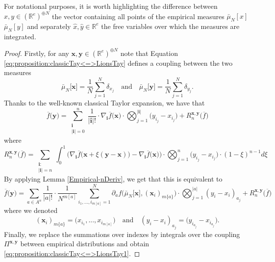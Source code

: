 \documentclass[a4paper,11pt,twoside]{article}
\numberwithin{equation}{section}
\theoremstyle{plain}
\newcommand{\bR}{\mathbb{R}}
\newcommand{\1}{\mathbbm{1}}
\begin{document}
	For notational purposes, it is worth highlighting the difference between $x, y \in (\bR^e)^{\oplus N}$ the vector containing all points of the empirical measures $\bar{\mu}_N[x]$ $\bar{\mu}_N[y]$ and separately $\hat{x}, \hat{y} \in \bR^e$ the free variables over which the measures are integrated. 
	
	
	\begin{proof}
		Firstly, for any $\boldsymbol{x}, \boldsymbol{y}\in (\bR^e)^{\oplus N}$ note that Equation \eqref{eq:proposition:classicTay<=>LionsTay} defines a coupling between the two measures
		$$
		\bar{\mu}_N\big[ \boldsymbol{x} \big] = \frac{1}{N} \sum_{j=1}^N \delta_{x_j} 
		\quad \mbox{and} \quad 
		\bar{\mu}_N\big[ \boldsymbol{y} \big] = \frac{1}{N} \sum_{j=1}^N \delta_{y_j}. 
		$$
		Thanks to the well-known classical Taylor expansion, we have that
		\begin{equation}
			\label{eq:classic-Taylor}
			\overline{f}\Big( \boldsymbol{y} \Big) 
			= 
			\sum_{\substack{\boldsymbol{i} \\ |\boldsymbol{i}| = 0}}^n \frac{1}{|\boldsymbol{i}|!} \cdot \nabla_{\boldsymbol{i}} \overline{f} \big( \boldsymbol{x} \big) \cdot \bigotimes_{j=1}^{|\boldsymbol{i}|} \big( y_{i_j} - x_{i_j} \big) + R_n^{\boldsymbol{x}, \boldsymbol{y}}\big( \overline{f} \big) 
		\end{equation}
		where
		\begin{equation}
			\label{eq:proposition:classicTay<=>LionsTayRem*}
			R_n^{\boldsymbol{x}, \boldsymbol{y}}\big( \overline{f} \big) = \sum_{\substack{\boldsymbol{i}: \\ |\boldsymbol{i}| = n}} \int_0^1 \Big( \nabla_{\boldsymbol{i}} \overline{f}\big( \boldsymbol{x} + \xi(\boldsymbol{y}-\boldsymbol{x}) \big)  - \nabla_{\boldsymbol{i}} \overline{f}\big( \boldsymbol{x} \big) \Big) \cdot \bigotimes_{j=1}^n \big( y_{i_j} - x_{i_j} \big) \cdot (1-\xi)^{n-1} d\xi
		\end{equation}
		By applying Lemma \ref{Empirical-nDeriv}, we get that this is equivalent to	
		\begin{equation*}
			\overline{f}\Big( \boldsymbol{y} \Big) = \sum_{a\in A^n} \frac{1}{|a|!} \cdot \frac{1}{N^{m[a]}} \sum_{i_1, ..., i_{m[a]} = 1}^{N} \partial_a f\Big( \bar{\mu}_N\big[ \boldsymbol{x} \big], (\boldsymbol{x}_i)_{m\{a\}} \Big) \cdot \bigotimes_{j=1}^{|a|} ( y_i -  x_i)_{a_j} + R_n^{\boldsymbol{x}, \boldsymbol{y}}\big( \overline{f} \big) 
		\end{equation*}
		where we denoted
		\begin{equation*}
			(\boldsymbol{x}_i)_{m\{a\}} = \big( x_{i_1},..., x_{i_{m[a]}} \big) 
			\quad \mbox{and} \quad 
			(y_i - x_i)_{a_j} = \big( y_{i_{a_j}} - x_{i_{a_j}} \big). 
		\end{equation*}
		Finally, we replace the summations over indexes by integrals over the coupling $\Pi^{\boldsymbol{x}, \boldsymbol{y}}$ between empirical distributions and obtain \eqref{eq:proposition:classicTay<=>LionsTay1}. 
		

\end{proof}
\end{document}

